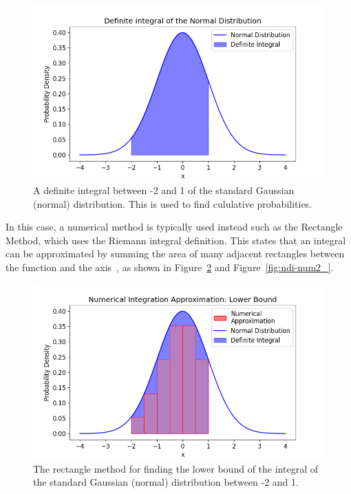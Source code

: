 \documentclass[12pt]{article}
\newcommand{\ndiFigCaption}[1]{The rectangle method for finding the #1 bound of the integral of the standard Gaussian (normal) distribution between -2 and 1.}
\begin{document}
    \begin{figure}[H]
        \centering
        \includegraphics[width=0.8\linewidth]{figures/ndi/ndi_}
        \caption{A definite integral between -2 and 1 of the standard Gaussian (normal) distribution. This is used to find cululative probabilities.}
        \label{fig:ndi_}
    \end{figure}

    In this case, a numerical method is typically used instead such as the Rectangle Method, which uses the Riemann integral definition.
    This states that an integral can be approximated by summing the area of many adjacent rectangles between the function and the axis~\cite{NumericalAnalysis2023}, as shown in Figure~\ref{fig:ndi-num_} and Figure~\ref{fig:ndi-num2_}.

    \begin{figure}[H]
        \centering
        \includegraphics[width=0.8\linewidth]{figures/ndi-num/ndi-num_}
        \caption{\ndiFigCaption{lower}}
        \label{fig:ndi-num_}
    \end{figure}
\end{document}
